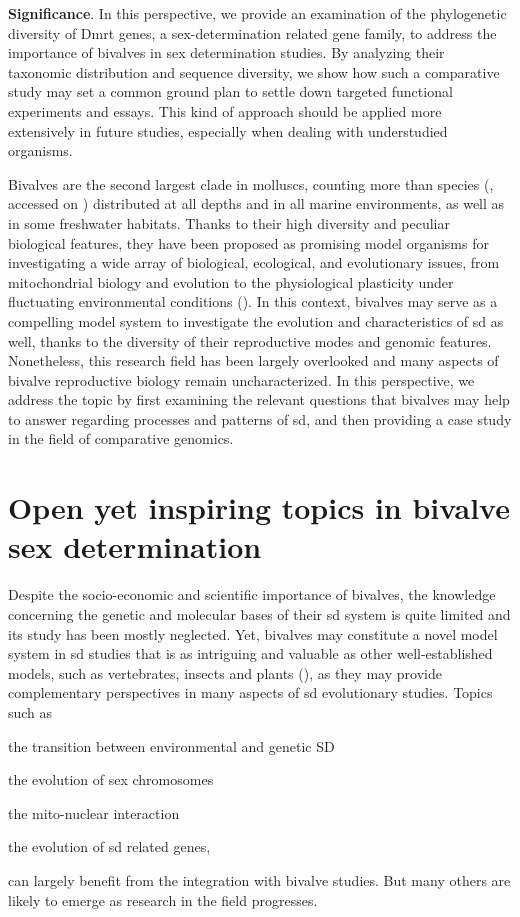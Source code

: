 \textbf{Significance}. In this perspective, we provide an examination of the phylogenetic diversity of Dmrt genes, a sex-determination related gene family, to address the importance of bivalves in sex determination studies. By analyzing their taxonomic distribution and sequence diversity, we show how such a comparative study may set a common ground plan to settle down targeted functional experiments and essays. This kind of approach should be applied more extensively in future studies, especially when dealing with understudied organisms.

\newpage

Bivalves are the second largest clade in molluscs, counting more than  species (, accessed on ) distributed at all depths and in all marine environments, as well as in some freshwater habitats. Thanks to their high diversity and peculiar biological features, they have been proposed as promising model organisms for investigating a wide array of biological, ecological, and evolutionary issues, from mitochondrial biology and evolution to the physiological plasticity under fluctuating environmental conditions (). In this context, bivalves may serve as a compelling model system to investigate the evolution and characteristics of \gls{sd} as well, thanks to the diversity of their reproductive modes and genomic features. Nonetheless, this research field has been largely overlooked and many aspects of bivalve reproductive biology remain uncharacterized. In this perspective, we address the topic by first examining the relevant questions that bivalves may help to answer regarding processes and patterns of \gls{sd}, and then providing a case study in the field of comparative genomics.

\section{Open yet inspiring topics in bivalve sex determination}
Despite the socio-economic and scientific importance of bivalves, the knowledge concerning the genetic and molecular bases of their \gls{sd} system is quite limited and its study has been mostly neglected. Yet, bivalves may constitute a novel model system in \gls{sd} studies that is as intriguing and valuable as other well-established models, such as vertebrates, insects and plants (), as they may provide complementary perspectives in many aspects of \gls{sd} evolutionary studies. Topics such as
\begin{inlinelist}[itemjoin={{, }}, itemjoin*={{, and }}]
	\item the transition between environmental and genetic SD
	\item the evolution of sex chromosomes
	\item the mito-nuclear interaction
	\item the evolution of \gls{sd} related genes,
\end{inlinelist}
can largely benefit from the integration with bivalve studies. But many others are likely to emerge as research in the field progresses.

